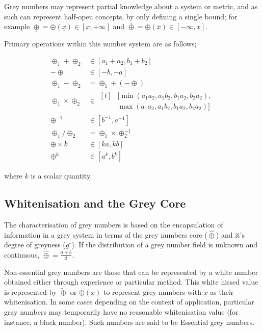 \documentclass[conference]{IEEEtran}
\begin{document}
Grey numbers may represent partial knowledge about a system or metric, and as such can represent half-open concepts, by only defining a single bound; for example $\underline\oplus = \oplus(\underline x ) \in [x, +\infty]$ and $\overline\oplus = \oplus(\overline x) \in [-\infty, x]$.

Primary operations within this number system are as follows;

\begin{subequations}
\begin{align}
  \oplus_1 + \oplus_2      &\in [a_1+a_2,b_1+b_2] \label{eq:grey_add}\\
           -\oplus         &\in [-b,-a] \label{eq:grey_neg} \\
  \oplus_1 - \oplus_2      &= \oplus_1+(-\oplus) \label{eq:grey_sub}\\
  \oplus_1 \times \oplus_2 &\in \begin{aligned}[t]
    &[\min(a_1 a_2, a_1 b_2, b_1 a_2, b_2 a_2), \\
    & \max(a_1 a_2, a_1 b_2, b_1 a_2, b_2 a_2)]
  \end{aligned} \label{grey_mult}\\
  \oplus^{-1} &\in [b^{-1}, a^{-1}] \label{eq:grey_inv}\\
  \oplus_1 / \oplus_2 & = \oplus_1 \times \oplus_2^{-1} \label{grey_mult} \\
  \oplus \times k &\in [ka,kb] \label{eq:grey_times_scalar}\\
  \oplus^k &\in [a^k, b^k] \label{eq:grey_exp}
\end{align}
\end{subequations}

where $k$ is a scalar quantity.
  
\subsection{Whitenisation and the Grey Core}

The characterisation of grey numbers is based on the encapsulation of information in a grey system in terms of the grey numbers core ($\hat\oplus$) and it's degree of greyness ($g^\circ$).
If the distribution of a grey number field is unknown and continuous, $\hat\oplus = \frac{a + b}{2}$.

Non-essential grey numbers are those that can be represented by a white number obtained either through experience or particular method. \cite{Liu2011}
This white hissed value is represented by $\tilde\oplus$ or $\oplus(x)$ to represent grey numbers with $x$ as their whitenisation.
In some cases depending on the context of application, particular gray numbers may temporarily have no reasonable whitenisation value (for instance, a black number). Such numbers are said to be Essential grey numbers.
\end{document}
